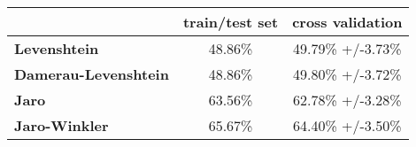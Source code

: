 \begin{tabular}{lcc}
\toprule
{} & train/test set & cross validation \\
\midrule
\textbf{Levenshtein        } &         48.86\% &  49.79\% +/-3.73\% \\
\textbf{Damerau-Levenshtein} &         48.86\% &  49.80\% +/-3.72\% \\
\textbf{Jaro               } &         63.56\% &  62.78\% +/-3.28\% \\
\textbf{Jaro-Winkler       } &         65.67\% &  64.40\% +/-3.50\% \\
\bottomrule
\end{tabular}
